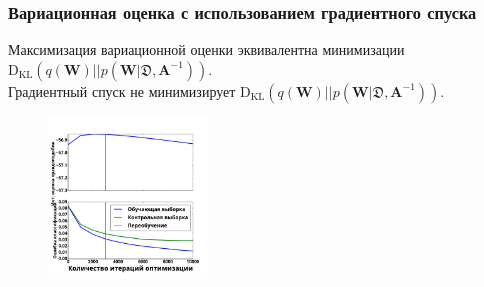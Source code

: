 \documentclass[usenames,dvipsnames,11pt,pdf,utf8,russian,aspectratio=169]{beamer}
\begin{document}
\begin{frame}
\frametitle{Вариационная оценка с использованием градиентного спуска}
\footnotesize
Максимизация вариационной оценки эквивалентна минимизации $\text{D}_{\text{KL}}(q(\mathbf{W})||p(\mathbf{W} | \mathfrak{D},\mathbf{A}^{-1}))$.\\
Градиентный спуск не минимизирует $\text{D}_{\text{KL}}(q(\mathbf{W})||p(\mathbf{W} | \mathfrak{D},\mathbf{A}^{-1}))$.
\begin{multicols}{2}

\begin{figure}
\end{figure}

\columnbreak


\begin{figure}
{\includegraphics[width=0.38\textwidth]{./slide_plots/sgd_show.pdf}}
\end{figure}
\end{multicols}
\end{frame}

\fi 
\end{document}
